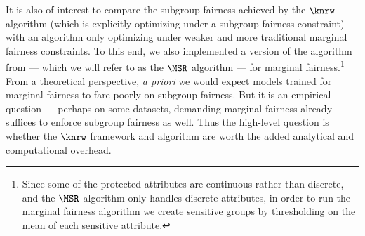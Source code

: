 It is also of interest to compare the subgroup fairness achieved by
the $\knrw$ algorithm (which is explicitly optimizing under a subgroup fairness constraint)
with an algorithm only optimizing under weaker and more
traditional marginal fairness constraints. To this end, we also implemented a version of the algorithm from \cite{MSR} --- which we will refer to as the $\MSR$ algorithm ---
for marginal
fairness.\footnote{Since some of the protected attributes are continuous rather than discrete, and the $\MSR$ algorithm only
handles discrete attributes, in order to run the marginal fairness algorithm we
create sensitive groups by thresholding on the mean of each sensitive attribute.}
From a theoretical perspective, {\em a priori\/}
we would expect models trained for marginal fairness to fare poorly on subgroup fairness. But it
is an empirical question --- perhaps on some datasets, demanding marginal fairness
already suffices to enforce subgroup fairness as well. Thus the high-level
question is whether the $\knrw$ framework and algorithm are worth the added analytical and computational overhead.


